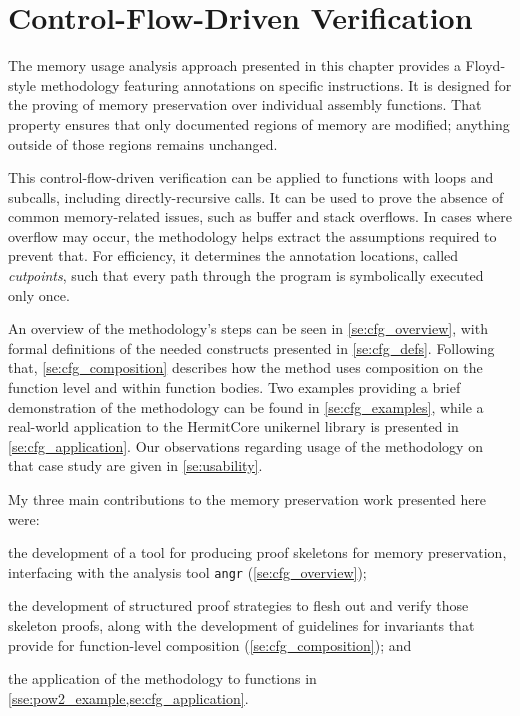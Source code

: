 \chapter{Control-Flow-Driven Verification}\label{ch:cfg}
The memory usage analysis approach presented in this chapter
provides a Floyd-style methodology featuring annotations on specific instructions.
It is designed for the proving of memory preservation%
over individual assembly functions.
That property ensures that only documented regions of memory are modified;%
anything outside of those regions remains unchanged.

This control-flow-driven verification
can be applied to functions with loops and subcalls,
including directly-recursive calls.
It can be used to prove the absence of common memory-related issues,
such as buffer and stack overflows. In cases where overflow may occur,
the methodology helps extract the assumptions required to prevent that.
For efficiency, it determines the annotation locations,
called \emph{cutpoints},%
such that every path through the program
is symbolically executed only once.%

An overview of the methodology's steps can be seen in \cref{se:cfg_overview},
with formal definitions of the needed constructs presented in \cref{se:cfg_defs}.
Following that, \cref{se:cfg_composition} describes how the method uses composition
on the function level and within function bodies.
Two examples providing a brief demonstration of the methodology
can be found in \cref{se:cfg_examples}, while a real-world application
to the HermitCore unikernel library \autocite{lankes2016hermitcore}
is presented in \cref{se:cfg_application}.
Our observations regarding usage of the methodology on that case study
are given in \cref{se:usability}.

My three main contributions to the memory preservation work presented here were:
\begin{enumerate*}
  \item the development of a tool for producing proof skeletons
  for memory preservation, interfacing with the analysis tool
  \texttt{angr} (\cref{se:cfg_overview});
  \item the development of structured proof strategies
  to flesh out and verify those skeleton proofs,
  along with the development of guidelines
  for invariants that provide for
  function-level composition (\cref{se:cfg_composition});
  and
  \item the application of the methodology to functions in
  \cref{sse:pow2_example,se:cfg_application}.
\end{enumerate*}

